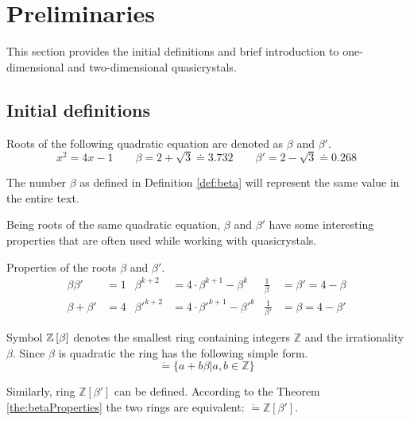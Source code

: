 \documentclass[text.tex]{subfiles}
\begin{document}
\section{Preliminaries}%
This section provides the initial definitions and brief introduction to one-dimensional and two-dimensional quasicrystals. 
\subsection{Initial definitions}
\begin{definition}
\label{def:beta}
Roots of the following quadratic equation are denoted as $\beta$ and $\beta'$.
$$x^2=4x-1 \qquad \beta = 2 + \sqrt{3} \doteq 3.732 \qquad \beta' = 2 - \sqrt{3} \doteq 0.268$$
\end{definition}

\begin{remark}
The number $\beta$ as defined in Definition \ref{def:beta} will represent the same value in the entire text.
\end{remark}

Being roots of the same quadratic equation, $\beta$ and $\beta'$ have some interesting properties that are often used while working with quasicrystals. 

\begin{theorem}
\label{the:betaProperties}
Properties of the roots $\beta$ and $\beta'$.
\begin{align*}
\beta\beta' &= 1 &   
\beta^{k+2} &= 4\cdot\beta^{k+1} - \beta^k & 
\frac{1}{\beta} &= \beta' = 4 - \beta \\
\beta + \beta' &= 4 &
{\beta'}^{k+2} &= 4\cdot{\beta'}^{k+1} - {\beta'}^k &
\frac{1}{\beta'} &= \beta = 4 - \beta'
\end{align*}
\end{theorem}

\begin{definition} 
Symbol $\mathbb{Z}\left[\beta\right]$ denotes the smallest ring containing integers $\mathbb{Z}$ and the irrationality $\beta$. Since $\beta$ is quadratic the ring has the following simple form.
$$\ring = \{ a + b\beta |a,b\in \mathbb{Z} \}$$
\end{definition}

\begin{remark}
Similarly, ring $\mathbb{Z}[\beta']$ can be defined. According to the Theorem \ref{the:betaProperties} the two rings are equivalent: $\ring = \mathbb{Z}\left[\beta'\right]$.
\end{remark}
\end{document}
